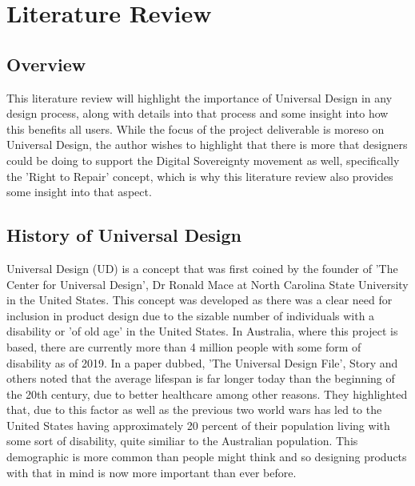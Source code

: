 
\chapter{Literature Review} %

\label{Chapter2} %


\section{Overview} %

This literature review will highlight the importance of Universal Design in any design process, along with details into that process and some insight into how this benefits all users.
While the focus of the project deliverable is moreso on Universal Design, the author wishes to highlight that there is more that designers could be doing to support the Digital Sovereignty movement as well, specifically the 'Right to Repair' concept, which is why this literature review also provides some insight into that aspect.


\section{History of Universal Design}
Universal Design (UD) is a concept that was first coined by the founder of 'The Center for Universal Design', Dr Ronald Mace at North Carolina State University in the United States\cite{ronald}.
This concept was developed as there was a clear need for inclusion in product design due to the sizable number of individuals with a disability or 'of old age' in the United States.
In Australia, where this project is based, there are currently more than 4 million people with some form of disability \cite{ausstats} as of 2019. 
In a paper dubbed, 'The Universal Design File'\cite{universalfile}, Story and others noted that the average lifespan is far longer today than the beginning of the 20th century, due to better healthcare among other reasons.
They highlighted that, due to this factor as well as the previous two world wars has led to the United States having approximately 20 percent of their population living with some sort of disability, quite similiar to the Australian population.
This demographic is more common than people might think and so designing products with that in mind is now more important than ever before.

